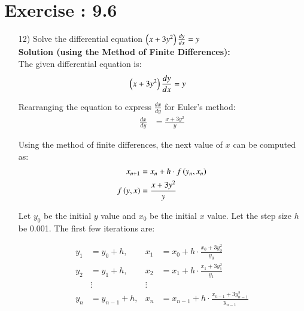 \documentclass[journal]{IEEEtran}
\begin{document}
\section*{Exercise : 9.6}
\begin{enumerate}
\item [12)] Solve the differential equation $\left(x + 3y^2\right) \frac{dy}{dx} = y $ \\
\textbf{Solution (using the Method of Finite Differences):}\\
The given differential equation is:
\begin{align}
    \left(x + 3y^2\right)  \frac{dy}{dx} &= y 
\end{align}

Rearranging the equation to express $\frac{dx}{dy}$ for Euler's method:
\begin{align}
    \frac{dx}{dy} &= \frac{x + 3y^2}{y}
\end{align}

Using the method of finite differences, the next value of $x$ can be computed as:
\begin{align}
    x_{n+1} &= x_n + h \cdot f\left(y_n, x_n\right) \\
    f\left(y, x\right) &= \frac{x + 3y^2}{y}
\end{align}

Let $y_0$ be the initial $y$ value and $x_0$ be the initial $x$ value. Let the step size $h$ be 0.001. The first few iterations are:

\begin{align*}
y_1 &= y_0 + h, & x_1 &= x_0 + h \cdot \frac{x_0 + 3y_0^2}{y_0} \\
y_2 &= y_1 + h, & x_2 &= x_1 + h \cdot \frac{x_1 + 3y_1^2}{y_1} \\
&\vdots  & \vdots \\
y_n &= y_{n-1} + h, & x_n &= x_{n-1} + h \cdot \frac{x_{n-1} + 3y_{n-1}^2}{y_{n-1}}
\end{align*}


\end{enumerate}
\end{document}
